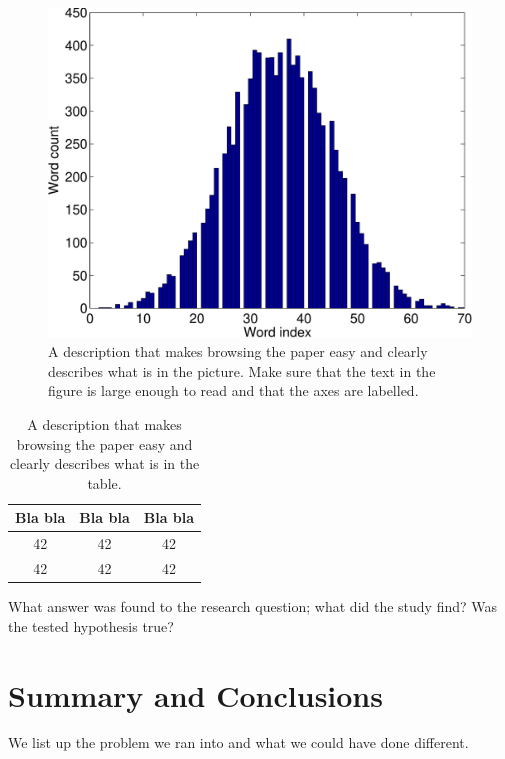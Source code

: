 \documentclass[a4paper,12pt]{article}
\begin{document}
\begin{figure}
\centering
\includegraphics[width=0.8\linewidth]{histogram}
\caption{A description that makes browsing the paper easy and clearly
describes what is in the picture. Make sure that the text in the figure
is large enough to read and that the axes are labelled.}
\label{fig:histogram}
\end{figure}



\begin{table}
\begin{center}
\begin{tabular}{|c|c|c|}
\hline
Bla bla & Bla bla & Bla bla \\ \hline
42 & 42 & 42 \\ \hline
42 & 42 & 42 \\ \hline
\end{tabular}
\caption{A description that makes browsing the paper easy and clearly
describes what is in the table.}
\label{tab:results}
\end{center}
\end{table}

What answer was found to the research question; what did the study find? Was the tested hypothesis true?

\section{Summary and Conclusions}
\label{sec:summary}



We list up the problem we ran into and what we could have done different.
\end{document}
